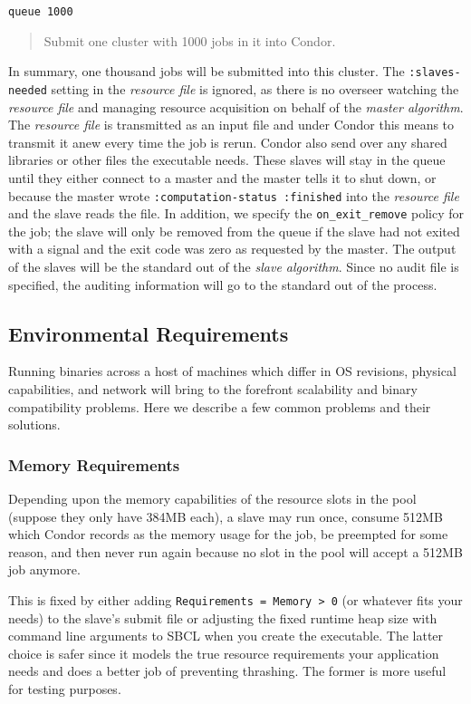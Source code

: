 \documentclass[titlepage,12pt]{book}
\newcommand{\sbcl}{SBCL\xspace}
\newcommand{\sa}{\textit{slave algorithm}\xspace}
\newcommand{\ma}{\textit{master algorithm}\xspace}
\newcommand{\rfile}{\textit{resource file}\xspace}
\newcommand{\keyword}[1]{\texttt{:#1}\xspace}
\newenvironment{explainline}[1]
	{\noindent\texttt{#1}\begin{quotation}}
	{\end{quotation}}
\begin{document}
\begin{explainline}
{queue 1000}
Submit one cluster with 1000 jobs in it into Condor.
\end{explainline}

In summary, one thousand jobs will be submitted into this cluster.
The \keyword{slaves-needed} setting in the \rfile is ignored, as there
is no overseer watching the \rfile and managing resource acquisition
on behalf of the \ma.  The \rfile is transmitted as an input file
and under Condor this means to transmit it anew every time the job is
rerun. Condor also send over any shared libraries or other files the
executable needs.  These slaves will stay in the queue until they
either connect to a master and the master tells it to shut down,
or because the master wrote \texttt{:computation-status :finished}
into the \rfile and the slave reads the file.  In addition, we specify
the \texttt{on\_exit\_remove} policy for the job; the slave will only
be removed from the queue if the slave had not exited with a signal
and the exit code was zero as requested by the master.  The output
of the slaves will be the standard out of the \sa. Since no audit
file is specified, the auditing information will go to the standard
out of the process.

\subsection{Environmental Requirements}

Running binaries across a host of machines which differ in OS
revisions, physical capabilities, and network will bring to the
forefront scalability and binary compatibility problems. Here we
describe a few common problems and their solutions.

\subsubsection{Memory Requirements}

Depending upon the memory capabilities of the resource slots in
the pool (suppose they only have 384MB each), a slave may run once,
consume 512MB which Condor records as the memory usage for the job,
be preempted for some reason, and then never run again because no
slot in the pool will accept a 512MB job anymore.

This is fixed by either adding \texttt{Requirements = Memory > 0}
(or whatever fits your needs) to the slave's submit file or adjusting
the fixed runtime heap size with command line arguments to \sbcl
when you create the executable. The latter choice is safer since it
models the true resource requirements your application needs and does
a better job of preventing thrashing. The former is more useful for
testing purposes.
\end{document}
